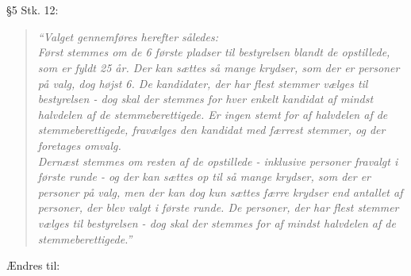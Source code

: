 \documentclass[a4paper,12pt,danish]{article}
\newcommand\cit[1]{
    \begin{quote}
        \textit{``#1''}
    \end{quote}
}
\newcommand\change[1]{
    \section{}
    #1
}
\begin{document}
\change{
	\S5 Stk. 12:
    \cit{Valget gennemføres herefter således:\\
Først stemmes om de 6 første pladser til bestyrelsen blandt de opstillede, som er fyldt 25 år. Der kan sættes så mange krydser, som der er personer på valg, dog højst 6. De kandidater, der har flest stemmer vælges til bestyrelsen - dog skal der stemmes for hver enkelt kandidat af mindst halvdelen af de stemmeberettigede. Er ingen stemt for af halvdelen af de stemmeberettigede, fravælges den kandidat med færrest stemmer, og der foretages omvalg.\\
Dernæst stemmes om resten af de opstillede - inklusive personer fravalgt i første runde - og der kan sættes op til så mange krydser, som der er personer på valg, men der kan dog kun sættes færre krydser end antallet af personer, der blev valgt i første runde. De personer, der har flest stemmer vælges til bestyrelsen - dog skal der stemmes for af mindst halvdelen af de stemmeberettigede.}
    Ændres til:

}
\end{document}
